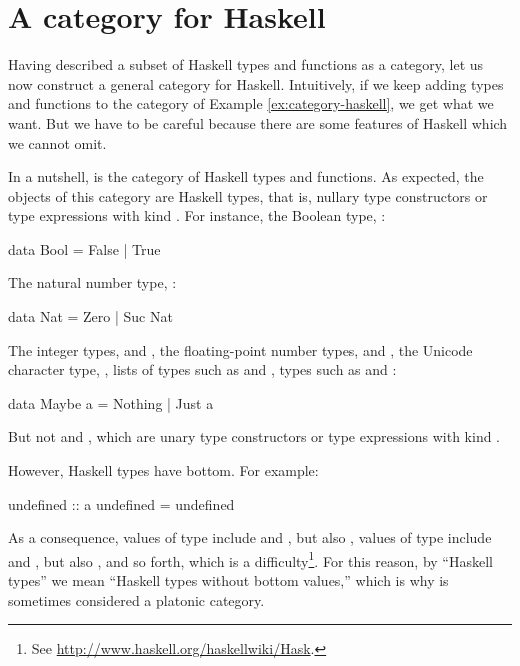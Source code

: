 \section{A category for Haskell}
\label{sec:category-haskell}

Having described a subset of Haskell types and functions as a
category, let us now construct a general category for Haskell.
Intuitively, if we keep adding types and functions to the category of
Example \ref{ex:category-haskell}, we get what we want. But we have to
be careful because there are some features of Haskell which we cannot
omit.

In a nutshell, \hask is the category of Haskell types and functions.
As expected, the objects of this category are Haskell types, that is,
nullary type constructors or type expressions with kind
\texthaskell{*}. For instance, the Boolean type, :
\begin{codehaskell}
data Bool = False | True
\end{codehaskell}
The natural number type, :
\begin{codehaskell}
data Nat = Zero | Suc Nat
\end{codehaskell}
The integer types,  and , the
floating-point number types,  and
, the Unicode character type, ,
lists of types such as \texthaskell{[Bool]} and \texthaskell{[Nat]},
 types such as  and
:
\begin{codehaskell}
data Maybe a = Nothing | Just a
\end{codehaskell}
But not \texthaskell{[]} and , which are unary type
constructors or type expressions with kind \texthaskell{* -> *}.

However, Haskell types have bottom. For example:
\begin{codehaskell}
undefined :: a
undefined = undefined
\end{codehaskell}
As a consequence, values of type  include
 and , but also
, values of type  include
 and , but also
, and so forth, which is a
difficulty\footnote{See
  \url{http://www.haskell.org/haskellwiki/Hask}.}. For this reason, by
``Haskell types'' we mean ``Haskell types without bottom values,''
which is why \hask is sometimes considered a platonic category.

